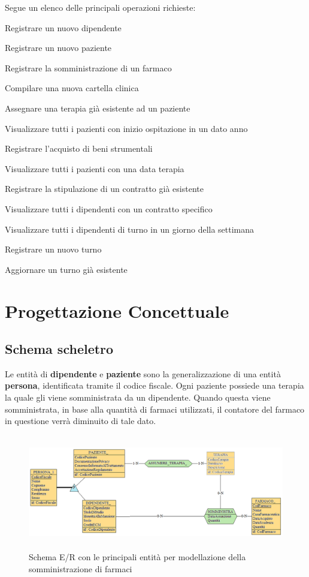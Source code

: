 \documentclass[a4paper, 12pt]{report}
\newenvironment{packed_enum}{
\begin{enumerate}
        \setlength{\itemsep}{1pt}
        \setlength{\parskip}{0pt}
        \setlength{\parsep}{0pt}
}{\end{enumerate}}
\begin{document}
Segue un elenco delle principali operazioni richieste:
\begin{packed_enum}
        \item Registrare un nuovo dipendente
        \item Registrare un nuovo paziente
        \item Registrare la somministrazione di un farmaco 
        \item Compilare una nuova cartella clinica 
        \item Assegnare una terapia già esistente ad un paziente
        \item Visualizzare tutti i pazienti con inizio ospitazione in un dato anno
        \item Registrare l'acquisto di beni strumentali
        \item Visualizzare tutti i pazienti con una data terapia
        \item Registrare la stipulazione di un contratto già esistente 
        \item Visualizzare tutti i dipendenti con un contratto specifico
        \item Visualizzare tutti i dipendenti di turno in un giorno della settimana
        \item Registrare un nuovo turno 
        \item Aggiornare un turno già esistente 
\end{packed_enum}

\chapter{Progettazione Concettuale}

\section{Schema scheletro}

\noindent
Le entità di \textbf{dipendente} e \textbf{paziente} sono la generalizzazione di una entità \textbf{persona}, identificata
tramite il codice fiscale. Ogni paziente possiede una terapia la quale gli viene somministrata da un dipendente.
Quando questa viene somministrata, in base alla quantità di farmaci utilizzati, il contatore del farmaco in questione verrà
diminuito di tale dato.

\begin{figure}[H]
        \centering
        \includegraphics[height=5cm]{img/dipendentePazienteERPostReif.png}
        \caption{Schema E/R con le principali entità per modellazione della somministrazione di farmaci}
\end{figure}
\end{document}
